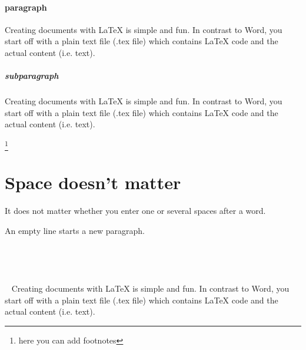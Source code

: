 \documentclass[12pt,draft,twocolumn]{article}
\begin{document}
\paragraph{paragraph} Creating documents with LaTeX is simple and fun. In contrast to Word, you start off with a plain text file (.tex file) which contains LaTeX code and the actual content (i.e. text).
\subparagraph{subparagraph} Creating documents with LaTeX is simple and fun. In contrast to Word, you start off with a plain text file (.tex file) which contains LaTeX code and the actual content (i.e. text). 

 \footnote{here you can add footnotes}
\section{Space doesn't matter}

\par It does not matter           whether
you enter one or
several
spaces after a word.

An empty line starts a new
paragraph.
~\\~\\~\\~\\~\\~
 Creating documents with LaTeX is simple and fun. \newline In contrast to Word, \newpage you start off with a plain text file (.tex file) which contains LaTeX code and the actual content (i.e. text). 
\end{document}

